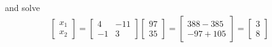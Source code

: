 \documentclass[14pt]{extarticle}
\begin{document}
and solve
\begin{align*}
	\begin{bmatrix}
		x_1 \\
		x_2
	\end{bmatrix}
	= \begin{bmatrix}
		4 & -11 \\
		-1 & 3
	\end{bmatrix}\begin{bmatrix} 97 \\ 35 \end{bmatrix}
	= \begin{bmatrix} 388-385 \\ -97+105 \end{bmatrix}
	= \begin{bmatrix} 3 \\ 8 \end{bmatrix}
\end{align*}


\cleardoublepage
\end{document}
